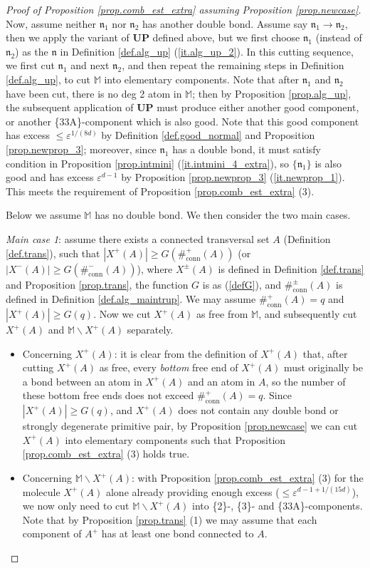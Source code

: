 \documentclass[10pt, reqno]{amsart}
\newcommand{\Mb}{\mathbb M}
\newcommand{\nf}{\mathfrak n}
\theoremstyle{definition}
\theoremstyle{remark}
\numberwithin{equation}{section}
\begin{document}
\begin{proof}[Proof of Proposition \ref{prop.comb_est_extra} assuming Proposition \ref{prop.newcase}]
Now, assume neither $\nf_1$ nor $\nf_2$ has another double bond. Assume say $\nf_1\rightarrow\nf_2$, then we apply the variant of \textbf{UP} defined above, but we first choose $\nf_1$ (instead of $\nf_2$) as the $\nf$ in Definition \ref{def.alg_up} (\ref{it.alg_up_2}). In this cutting sequence, we first cut $\nf_1$ and next $\nf_2$, and then repeat the remaining steps in Definition \ref{def.alg_up}, to cut $\Mb$ into elementary components. Note that after $\nf_1$ and $\nf_2$ have been cut, there is no deg 2 atom in $\Mb$; then by Proposition \ref{prop.alg_up}, the subsequent application of \textbf{UP} must produce either another good component, or another \{33A\}-component which is also good. Note that this good component has excess $\leq\varepsilon^{1/(8d)}$ by Definition \ref{def.good_normal} and Proposition \ref{prop.newprop_3}; moreover, since $\nf_1$ has a double bond, it must satisfy condition in Proposition \ref{prop.intmini} (\ref{it.intmini_4_extra}), so $\{\nf_1\}$ is also good and has excess $\varepsilon^{d-1}$ by Proposition \ref{prop.newprop_3} (\ref{it.newprop_1}). This meets the requirement of Proposition \ref{prop.comb_est_extra} (3).

\smallskip
Below we assume $\Mb$ has no double bond. We then consider the two main cases.

\emph{Main case 1}: assume there exists a connected transversal set $A$ (Definition \ref{def.trans}), such that $|X^+(A)|\geq G(\#_{\mathrm{conn}}^+(A))$ (or $|X^-(A)|\geq G(\#_{\mathrm{conn}}^-(A))$), where $X^\pm(A)$ is defined in Definition \ref{def.trans} and Proposition \ref{prop.trans}, the function $G$ is as (\ref{defG}), and $\#_{\mathrm{conn}}^\pm(A)$ is defined in Definition \ref{def.alg_maintrup}. We may assume $\#_{\mathrm{conn}}^+(A)=q$ and $|X^+(A)|\geq G(q)$. Now we cut $X^+(A)$ as free from $\Mb$, and subsequently cut $X^+(A)$ and $\Mb\backslash X^+(A)$ separately.
\begin{itemize}
\item Concerning $X^+(A)$: it is clear from the definition of $X^+(A)$ that, after cutting $X^+(A)$ as free, every \emph{bottom} free end of $X^+(A)$ must originally be a bond between an atom in $X^+(A)$ and an atom in $A$, so the number of these bottom free ends does not exceed $\#_{\mathrm{conn}}^+(A)=q$. Since $|X^+(A)|\geq G(q)$, and $X^+(A)$ does not contain any double bond or strongly degenerate primitive pair, by Proposition \ref{prop.newcase} we can cut $X^+(A)$ into elementary components such that Proposition \ref{prop.comb_est_extra} (3) holds true.
\item Concerning $\Mb\backslash X^+(A)$: with Proposition \ref{prop.comb_est_extra} (3) for the molecule $X^+(A)$ alone already providing enough excess ($\leq \varepsilon^{d-1+1/(15d)}$), we now only need to cut $\Mb\backslash X^+(A)$ into \{2\}-, \{3\}- and \{33A\}-components. Note that by Proposition \ref{prop.trans} (1) we may assume that each component of $A^+$ has at least one bond connected to $A$.


\end{itemize}
\end{proof}
\end{document}
